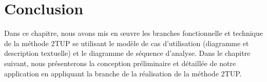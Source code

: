 \section*{Conclusion}
Dans ce chapitre, nous avons mis en œuvre les branches fonctionnelle et technique de la méthode 2TUP se utilisant le modèle de cas d'utilisation (diagramme et description textuelle) et le diagramme de séquence d'analyse. Dans le chapitre suivant, nous présenterons la conception préliminaire et détaillée de notre application en appliquant la branche de la réalisation de la méthode 2TUP.